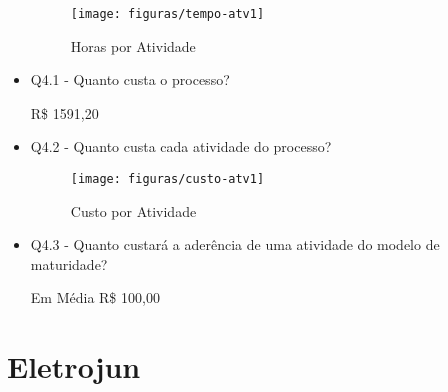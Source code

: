 \begin{itemize}
\begin{figure}[H]
  \center
  \texttt{[image: figuras/tempo-atv1]}
  \caption{Horas por Atividade}
  \label{fig:tempo-atv1}
\end{figure}

\item Q4.1 - Quanto custa o processo?

R\$ 1591,20

\item Q4.2 - Quanto custa cada atividade do processo?


\begin{figure}[H]
  \center
  \texttt{[image: figuras/custo-atv1]}
  \caption{Custo por Atividade}
  \label{fig:custo-atv1}
\end{figure}

\item Q4.3 - Quanto custará a aderência de uma atividade do modelo de maturidade?

Em Média R\$ 100,00


\end{itemize}

\section{Eletrojun}

